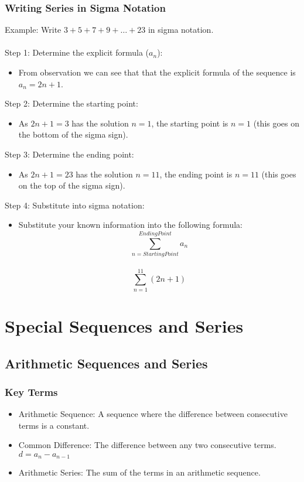 \documentclass[12pt]{article}
\begin{document}
\subsubsection{Writing Series in Sigma Notation}
Example: Write $3 + 5 + 7 + 9 + \dots + 23$ in sigma notation. \\ \\
Step 1: Determine the explicit formula ($a_n$):
\begin{itemize}
    \item From observation we can see that that the explicit formula of the sequence is $a_n = 2n + 1$.
\end{itemize}
Step 2: Determine the starting point:
\begin{itemize}
    \item As $2n + 1 = 3$ has the solution $n = 1$, the starting point is $n = 1$ (this goes on the bottom of the sigma sign).
\end{itemize}
Step 3: Determine the ending point:
\begin{itemize}
    \item As $2n + 1 = 23$ has the solution $n = 11$, the ending point is $n = 11$ (this goes on the top of the sigma sign).
\end{itemize}
Step 4: Substitute into sigma notation:
\begin{itemize}
    \item Substitute your known information into the following formula:
    $$\sum_{n=Starting Point}^{Ending Point} a_n$$ \\
    $$\sum_{n=1}^{11} (2n+1)$$
\end{itemize} \newpage
\section{Special Sequences and Series}
\subsection{Arithmetic Sequences and Series}
\subsubsection{Key Terms}
\begin{itemize}
    \item Arithmetic Sequence: A sequence where the difference between consecutive terms is a constant.
    \item Common Difference: The difference between any two consecutive terms. $d = a_n - a_{n-1}$
    \item Arithmetic Series: The sum of the terms in an arithmetic sequence.
\end{itemize}
\end{document}
